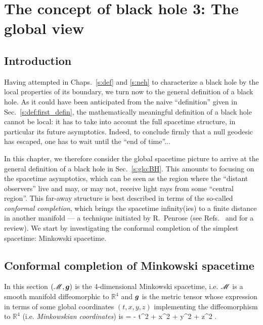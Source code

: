 \chapter{The concept of black hole 3: The global view}
\label{s:glo}

\minitoc

\section{Introduction}

Having attempted in Chaps.~\ref{s:def} and \ref{s:neh} to characterize a black hole by the local
properties of its boundary, we turn now to the general definition of a black
hole. As it could have been anticipated from the naive ``definition'' given
in Sec.~\ref{s:def:first_defin}, the mathematically meaningful definition
of a black hole cannot be local: it has to take into account the full
spacetime structure, in particular its future asymptotics. Indeed, to conclude
firmly that a null geodesic has escaped, one has to wait until the ``end
of time''...

In this chapter, we therefore consider the global spacetime picture to
arrive at the general definition of a black hole in
Sec.~\ref{s:glo:BH}.
This amounts to focusing on the
spacetime asymptotics, which can be seen as
the region where the ``distant observers'' live and may, or may not, receive
light rays from some ``central region''. This far-away structure is best
described in terms of the so-called \emph{conformal completion}, which brings
the spacetime infinity(ies) to a finite distance in another manifold
--- a technique initiated by R.~Penrose \cite{Penro63,Penro64} (see
Refs.~\cite{Fraue04} and \cite{Nicol17} for a review).
We start by investigating the conformal completion of the simplest
spacetime: Minkowski spacetime.


\section{Conformal completion of Minkowski spacetime} \label{s:glo:conf_Mink}

In this section $(\mathscr{M},\bm{g})$ is the 4-dimensional Minkowski spacetime,
i.e. $\mathscr{M}$ is a smooth manifold diffeomorphic to $\mathbb{R}^4$ and $\bm{g}$
is the metric tensor whose expression in terms of some global coordinates
$(t, x, y, z)$ implementing the diffeomorphism to $\mathbb{R}^4$
(i.e. \emph{Minkowskian coordinates})
is
\be \label{e:glo:Mink_metric}
     = - \dd t^2 + \dd x^2 + \dd y^2 + \dd z^2 .
\ee

